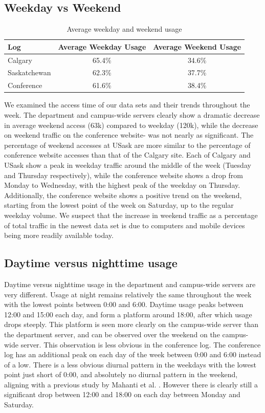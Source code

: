 \documentclass[10pt,conference]{IEEEtran}
\begin{document}
\subsection{Weekday vs Weekend} %
\label{sub:weekday_vs_weekend}
\begin{table}[h]
    \caption{Average weekday and weekend usage}\label{tab:weeklyusage}
    \begin{tabular}{l | c c}
        Log & Average Weekday Usage & Average Weekend Usage\\
        \hline
        Calgary & 65.4\% & 34.6\%\\
        Saskatchewan & 62.3\% & 37.7\%\\
        Conference & 61.6\% & 38.4\%
    \end{tabular}
\end{table}

We examined the access time of our data sets and their trends throughout the week. The department and campus-wide servers clearly show a dramatic decrease in average weekend access (63k) compared to weekday (120k), while the decrease on weekend traffic on the conference website-  was not nearly as significant. The percentage of weekend accesses at USask are more similar to the percentage of conference website accesses than that of the Calgary site. Each of Calgary and USask show a peak in weekday traffic around the middle of the week (Tuesday and Thursday respectively), while the conference website shows a drop from Monday to Wednesday, with the highest peak of the weekday on Thursday. Additionally, the conference website shows a positive trend on the weekend, starting from the lowest point of the week on Saturday, up to the regular weekday volume. We suspect that the increase in weekend traffic as a percentage of total traffic in the newest data set is due to computers and mobile devices being more readily available today.

\subsection{Daytime versus nighttime usage} %
\label{sub:daytime_versus_nighttime_usage}
Daytime versus nighttime usage in the department and campus-wide servers are very different. Usage at night remains relatively the same throughout the week with the lowest points between 0:00 and 6:00. Daytime usage peaks between 12:00 and 15:00 each day, and form a platform around 18:00, after which usage drops steeply.  This platform is seen more clearly on the campus-wide server than the department server, and can be observed over the weekend on the campus-wide server. This observation is less obvious in the conference log. The conference log has an additional peak on each day of the week between 0:00 and 6:00 instead of a low. There is a less obvious diurnal pattern in the weekdays with the lowest point just short of 0:00, and absolutely no diurnal pattern in the weekend, aligning with a previous study by Mahanti et al. \cite{Mahanti_Wu}. However there is clearly still a significant drop between 12:00 and 18:00 on each day between Monday and Saturday. 
\end{document}
